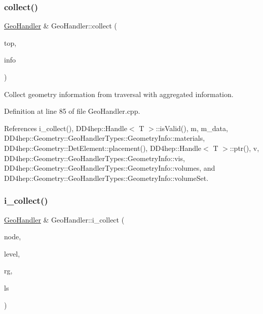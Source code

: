 \subsubsection{\texorpdfstring{collect()}{collect()}\hspace{0.1cm}{\footnotesize\ttfamily [2/2]}}
{\footnotesize\ttfamily \hyperlink{class_d_d4hep_1_1_geometry_1_1_geo_handler}{Geo\+Handler} \& Geo\+Handler\+::collect (\begin{DoxyParamCaption}\item[{\hyperlink{class_d_d4hep_1_1_geometry_1_1_det_element}{Det\+Element}}]{top,  }\item[{\hyperlink{class_d_d4hep_1_1_geometry_1_1_geo_handler_types_1_1_geometry_info}{Geometry\+Info} \&}]{info }\end{DoxyParamCaption})}



Collect geometry information from traversal with aggregated information. 



Definition at line 85 of file Geo\+Handler.\+cpp.



References i\+\_\+collect(), D\+D4hep\+::\+Handle$<$ T $>$\+::is\+Valid(), m, m\+\_\+data, D\+D4hep\+::\+Geometry\+::\+Geo\+Handler\+Types\+::\+Geometry\+Info\+::materials, D\+D4hep\+::\+Geometry\+::\+Det\+Element\+::placement(), D\+D4hep\+::\+Handle$<$ T $>$\+::ptr(), v, D\+D4hep\+::\+Geometry\+::\+Geo\+Handler\+Types\+::\+Geometry\+Info\+::vis, D\+D4hep\+::\+Geometry\+::\+Geo\+Handler\+Types\+::\+Geometry\+Info\+::volumes, and D\+D4hep\+::\+Geometry\+::\+Geo\+Handler\+Types\+::\+Geometry\+Info\+::volume\+Set.

\hypertarget{class_d_d4hep_1_1_geometry_1_1_geo_handler_ab075dd24d4b494b1f6b8508e39d6426b}{}\label{class_d_d4hep_1_1_geometry_1_1_geo_handler_ab075dd24d4b494b1f6b8508e39d6426b} 
\subsubsection{\texorpdfstring{i\+\_\+collect()}{i\_collect()}}
{\footnotesize\ttfamily \hyperlink{class_d_d4hep_1_1_geometry_1_1_geo_handler}{Geo\+Handler} \& Geo\+Handler\+::i\+\_\+collect (\begin{DoxyParamCaption}\item[{const T\+Geo\+Node $\ast$}]{node,  }\item[{int}]{level,  }\item[{\hyperlink{class_d_d4hep_1_1_geometry_1_1_region}{Region}}]{rg,  }\item[{\hyperlink{class_d_d4hep_1_1_geometry_1_1_limit_set}{Limit\+Set}}]{ls }\end{DoxyParamCaption})\hspace{0.3cm}{\ttfamily [protected]}}



